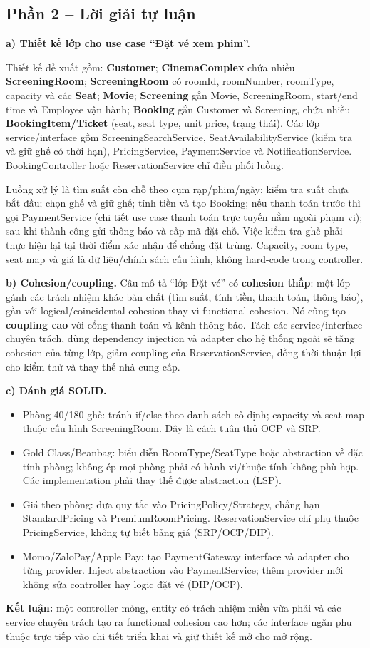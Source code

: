 \documentclass[11pt,a4paper]{article}
\begin{document}
\subsection*{Phần 2 -- Lời giải tự luận}
\textbf{a) Thiết kế lớp cho use case ``Đặt vé xem phim''.}

Thiết kế đề xuất gồm: \textbf{Customer}; \textbf{CinemaComplex} chứa nhiều \textbf{ScreeningRoom}; \textbf{ScreeningRoom} có roomId, roomNumber, roomType, capacity và các \textbf{Seat}; \textbf{Movie}; \textbf{Screening} gắn Movie, ScreeningRoom, start/end time và Employee vận hành; \textbf{Booking} gắn Customer và Screening, chứa nhiều \textbf{BookingItem/Ticket} (seat, seat type, unit price, trạng thái). Các lớp service/interface gồm ScreeningSearchService, SeatAvailabilityService (kiểm tra và giữ ghế có thời hạn), PricingService, PaymentService và NotificationService. BookingController hoặc ReservationService chỉ điều phối luồng.

Luồng xử lý là tìm suất còn chỗ theo cụm rạp/phim/ngày; kiểm tra suất chưa bắt đầu; chọn ghế và giữ ghế; tính tiền và tạo Booking; nếu thanh toán trước thì gọi PaymentService (chi tiết use case thanh toán trực tuyến nằm ngoài phạm vi); sau khi thành công gửi thông báo và cấp mã đặt chỗ. Việc kiểm tra ghế phải thực hiện lại tại thời điểm xác nhận để chống đặt trùng. Capacity, room type, seat map và giá là dữ liệu/chính sách cấu hình, không hard-code trong controller.

\textbf{b) Cohesion/coupling.} Câu mô tả ``lớp Đặt vé'' có \textbf{cohesion thấp}: một lớp gánh các trách nhiệm khác bản chất (tìm suất, tính tiền, thanh toán, thông báo), gần với logical/coincidental cohesion thay vì functional cohesion. Nó cũng tạo \textbf{coupling cao} với cổng thanh toán và kênh thông báo. Tách các service/interface chuyên trách, dùng dependency injection và adapter cho hệ thống ngoài sẽ tăng cohesion của từng lớp, giảm coupling của ReservationService, đồng thời thuận lợi cho kiểm thử và thay thế nhà cung cấp.

\textbf{c) Đánh giá SOLID.}
\begin{itemize}[leftmargin=1.05cm,itemsep=1pt]
  \item Phòng 40/180 ghế: tránh if/else theo danh sách cố định; capacity và seat map thuộc cấu hình ScreeningRoom. Đây là cách tuân thủ OCP và SRP.
  \item Gold Class/Beanbag: biểu diễn RoomType/SeatType hoặc abstraction về đặc tính phòng; không ép mọi phòng phải có hành vi/thuộc tính không phù hợp. Các implementation phải thay thế được abstraction (LSP).
  \item Giá theo phòng: đưa quy tắc vào PricingPolicy/Strategy, chẳng hạn StandardPricing và PremiumRoomPricing. ReservationService chỉ phụ thuộc PricingService, không tự biết bảng giá (SRP/OCP/DIP).
  \item Momo/ZaloPay/Apple Pay: tạo PaymentGateway interface và adapter cho từng provider. Inject abstraction vào PaymentService; thêm provider mới không sửa controller hay logic đặt vé (DIP/OCP).
\end{itemize}

\textbf{Kết luận:} một controller mỏng, entity có trách nhiệm miền vừa phải và các service chuyên trách tạo ra functional cohesion cao hơn; các interface ngăn phụ thuộc trực tiếp vào chi tiết triển khai và giữ thiết kế mở cho mở rộng.
\end{document}
